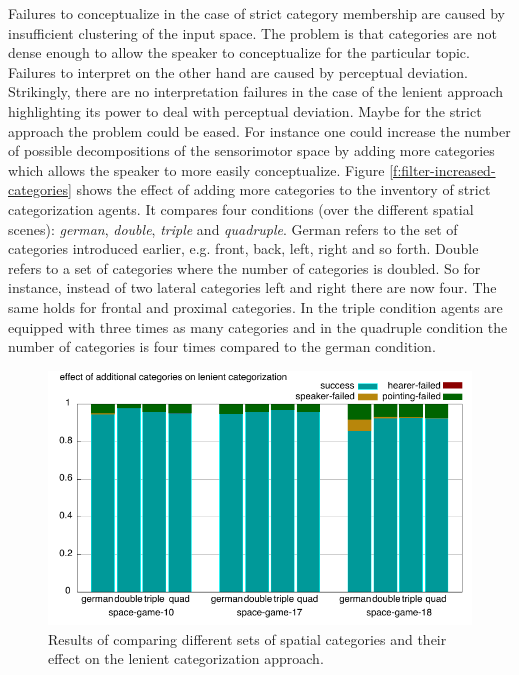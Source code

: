Failures to conceptualize in the case of strict category membership are caused by 
insufficient clustering of the input space. The problem is that categories are not
dense enough to allow the speaker to conceptualize for the particular topic.
Failures to interpret on the other hand are caused by perceptual deviation.
Strikingly, there are no interpretation failures in the case of the lenient approach
highlighting its power to deal with perceptual deviation. Maybe for the strict
approach the problem could be eased. For instance one could increase
the number of possible decompositions of the sensorimotor space
by adding more categories which allows the speaker to more easily conceptualize.
Figure \ref{f:filter-increased-categories} shows the effect of 
adding more categories to the inventory of strict categorization agents.
It compares four conditions (over the different spatial scenes):
\emph{german}, \emph{double}, \emph{triple} and \emph{quadruple}.
German refers to the set of categories introduced earlier, e.g. front, back, left, 
right and so forth. Double refers to a set of categories where the number of 
categories is doubled. So for instance, instead of two lateral categories left and right 
there are now four. The same holds for frontal and proximal categories. In the triple 
condition agents are equipped with three times as many categories and in the 
quadruple condition the number of categories is four times compared to the 
german condition. 

\begin{figure}
\begin{center}
\includegraphics[width=1\columnwidth]{figs/apply-more-categories.pdf}
\end{center}
\caption[Effect of additional categories on lenient categorization]
{Results of comparing different sets of spatial categories and their 
effect on the lenient categorization approach.}
\label{f:apply-increased-categories}
\end{figure}

